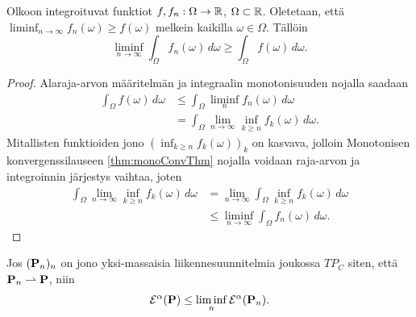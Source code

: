 \documentclass[12pt,oneside,a4paper]{amsbook} %
\begin{document}
\begin{lemma}\label{le:intRFctLSC} 
    Olkoon integroituvat funktiot $f, f_n : \Omega \to \R$, $\Omega \subset \R$. Oletetaan, että $\displaystyle \liminf_{n\to\infty} f_n(\omega) \ge f(\omega)$ melkein kaikilla $\omega \in \Omega$. Tällöin
        \begin{equation*}
            \liminf_{n\to \infty} \int_\Omega f_n(\omega) \, d\omega \ge \int_\Omega f(\omega)\, d\omega.
        \end{equation*}
\end{lemma}
\begin{proof}
Alaraja-arvon määritelmän ja integraalin monotonisuuden nojalla saadaan
    \begin{align*}
        \int_\Omega f(\omega) \, d\omega &\le \int_\Omega \liminf_n f_n(\omega) \, d\omega \\
        & = \int_\Omega \lim_{n\to\infty} \inf_{k\ge n} f_k(\omega) \, d\omega.
    \end{align*}
 Mitallisten funktioiden jono $(\inf_{k\ge n}f_k(\omega))_k$ on kasvava, jolloin Monotonisen konvergenssilauseen \ref{thm:monoConvThm} nojalla voidaan raja-arvon ja integroinnin järjestys vaihtaa, joten
    \begin{align*}
         \int_\Omega \lim_{n\to\infty} \inf_{k\ge n} f_k(\omega) \, d\omega &= \lim_{n\to\infty} \int_\Omega \inf_{k\ge n} f_k(\omega) \, d\omega \\
        &\le  \liminf_{n\to\infty} \int_\Omega f_n(\omega) \, d\omega. 
    \end{align*}
\end{proof}

\begin{theorem}\label{thm:energyLSC}
    Jos $(\P_n)_n$ on jono yksi-massaisia liikennesuunnitelmia joukossa $TP_C$ siten, että $\P_n \rightharpoonup \P$, niin
        \begin{equation*}
            \E^\alpha(\P) \le \liminf_n \E^\alpha(\P_n).
        \end{equation*}
\end{theorem}
\end{document}
